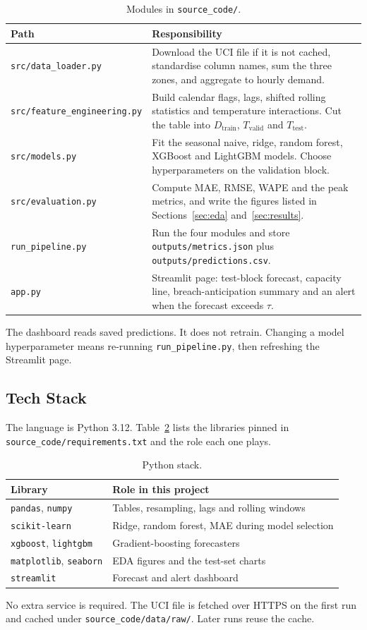 \begin{table}[h]
  \centering
  \small
  \begin{tabular}{@{}lp{9.4cm}@{}}
    \toprule
    Path & Responsibility \\
    \midrule
    \texttt{src/data\_loader.py} & Download the UCI file if it is not cached, standardise column names, sum the three zones, and aggregate to hourly demand. \\
    \texttt{src/feature\_engineering.py} & Build calendar flags, lags, shifted rolling statistics and temperature interactions. Cut the table into \(D_{\mathrm{train}}\), \(T_{\mathrm{valid}}\) and \(T_{\mathrm{test}}\). \\
    \texttt{src/models.py} & Fit the seasonal naive, ridge, random forest, XGBoost and LightGBM models. Choose hyperparameters on the validation block. \\
    \texttt{src/evaluation.py} & Compute MAE, RMSE, WAPE and the peak metrics, and write the figures listed in Sections~\ref{sec:eda} and~\ref{sec:results}. \\
    \texttt{run\_pipeline.py} & Run the four modules and store \texttt{outputs/metrics.json} plus \texttt{outputs/predictions.csv}. \\
    \texttt{app.py} & Streamlit page: test-block forecast, capacity line, breach-anticipation summary and an alert when the forecast exceeds \(\tau\). \\
    \bottomrule
  \end{tabular}
  \caption{Modules in \texttt{source\_code/}.}
  \label{tab:modules}
\end{table}

The dashboard reads saved predictions. It does not retrain. Changing a model
hyperparameter means re-running \texttt{run\_pipeline.py}, then refreshing
the Streamlit page.

\subsection{Tech Stack}
\label{sec:stack}

The language is Python 3.12. Table~\ref{tab:stack} lists the libraries pinned
in \texttt{source\_code/requirements.txt} and the role each one plays.

\begin{table}[h]
  \centering
  \small
  \begin{tabular}{@{}ll@{}}
    \toprule
    Library & Role in this project \\
    \midrule
    \texttt{pandas}, \texttt{numpy} & Tables, resampling, lags and rolling windows \\
    \texttt{scikit-learn} & Ridge, random forest, MAE during model selection \\
    \texttt{xgboost}, \texttt{lightgbm} & Gradient-boosting forecasters \\
    \texttt{matplotlib}, \texttt{seaborn} & EDA figures and the test-set charts \\
    \texttt{streamlit} & Forecast and alert dashboard \\
    \bottomrule
  \end{tabular}
  \caption{Python stack.}
  \label{tab:stack}
\end{table}

No extra service is required. The UCI file is fetched over HTTPS on the first
run and cached under \texttt{source\_code/data/raw/}. Later runs reuse the
cache.
